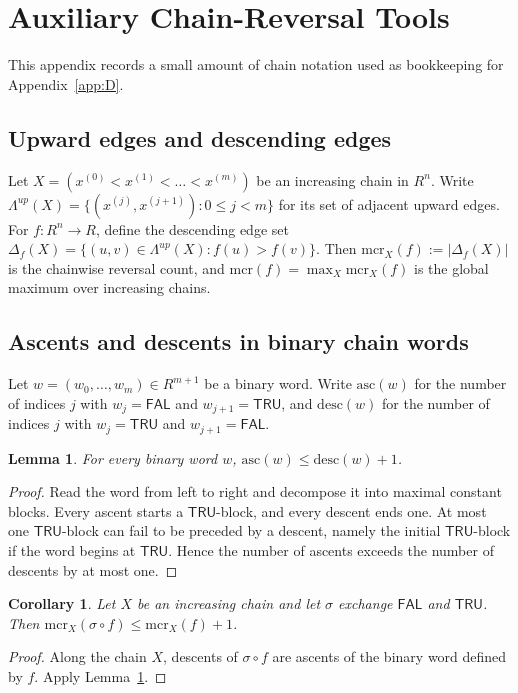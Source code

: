 \documentclass[11pt]{article}
\newtheorem{lemma}{Lemma}
\newtheorem{corollary}{Corollary}
\theoremstyle{remark}
\newcommand{\FAL}{\ensuremath{\mathsf{FAL}}}
\newcommand{\TRU}{\ensuremath{\mathsf{TRU}}}
\newcommand{\mcr}{\ensuremath{\mathrm{mcr}}}
\newcommand{\desc}{\mathrm{desc}}
\newcommand{\asc}{\mathrm{asc}}
\begin{document}
\section{Auxiliary Chain-Reversal Tools}

This appendix records a small amount of chain notation used as bookkeeping
for Appendix~\ref{app:D}.

\subsection{Upward edges and descending edges}

Let $X=(x^{(0)}<x^{(1)}<\dots<x^{(m)})$ be an increasing chain in $R^n$.
Write $\Lambda^{up}(X)=\{(x^{(j)},x^{(j+1)}): 0\le j<m\}$ for its set of
adjacent upward edges. For $f:R^n\to R$, define the descending edge set
$\Delta_f(X)=\{(u,v)\in\Lambda^{up}(X): f(u)>f(v)\}$. Then
$\mcr_X(f):=|\Delta_f(X)|$ is the chainwise reversal count, and
$\mcr(f)=\max_X \mcr_X(f)$ is the global maximum over increasing chains.

\subsection{Ascents and descents in binary chain words}

Let $w=(w_0,\dots,w_m)\in R^{m+1}$ be a binary word. Write $\asc(w)$ for
the number of indices $j$ with $w_j=\FAL$ and $w_{j+1}=\TRU$, and
$\desc(w)$ for the number of indices $j$ with $w_j=\TRU$ and
$w_{j+1}=\FAL$.

\begin{lemma}\label{lem:E1}
For every binary word $w$, $\asc(w)\le\desc(w)+1$.
\end{lemma}

\begin{proof}
Read the word from left to right and decompose it into maximal constant
blocks. Every ascent starts a $\TRU$-block, and every descent ends one. At
most one $\TRU$-block can fail to be preceded by a descent, namely the
initial $\TRU$-block if the word begins at $\TRU$. Hence the number of
ascents exceeds the number of descents by at most one.
\end{proof}

\begin{corollary}
Let $X$ be an increasing chain and let $\sigma$ exchange $\FAL$ and $\TRU$.
Then $\mcr_X(\sigma\circ f)\le\mcr_X(f)+1$.
\end{corollary}

\begin{proof}
Along the chain $X$, descents of $\sigma\circ f$ are ascents of the binary
word defined by $f$. Apply Lemma~\ref{lem:E1}.
\end{proof}
\end{document}
